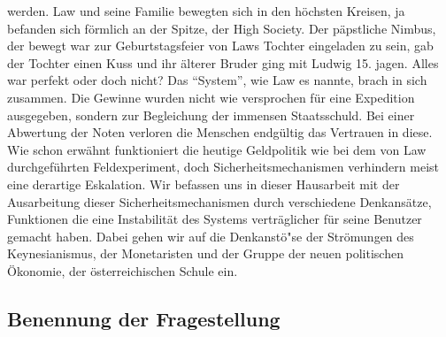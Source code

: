 \documentclass[
        onecolumn,
        a4paper,
        abstracton,
        parskip=half
        ,final
        ]{scrartcl}
\begin{document}
werden. Law und seine Familie bewegten sich in den h{\"o}chsten Kreisen, ja befanden sich f{\"o}rmlich an der Spitze, der High Society. Der p{\"a}pstliche Nimbus, der bewegt war zur Geburtstagsfeier von Laws Tochter eingeladen zu sein, gab der Tochter einen Kuss und ihr {\"a}lterer Bruder ging mit Ludwig 15. jagen.
Alles war perfekt oder doch nicht? Das "`System"', wie Law es nannte, brach in sich zusammen. Die Gewinne wurden nicht wie versprochen f{\"u}r eine Expedition ausgegeben, sondern zur Begleichung der immensen Staatsschuld. Bei einer Abwertung der Noten verloren die Menschen endg{\"u}ltig das Vertrauen in diese.
Wie schon erw{\"a}hnt funktioniert die heutige Geldpolitik wie bei dem von Law durchgef{\"u}hrten Feldexperiment, doch Sicherheitsmechanismen verhindern meist eine derartige Eskalation.
Wir befassen uns in dieser Hausarbeit mit der Ausarbeitung dieser Sicherheitsmechanismen durch verschiedene Denkans{\"a}tze, Funktionen die eine Instabilit{\"a}t des Systems vertr{\"a}glicher f{\"u}r seine Benutzer gemacht haben. Dabei gehen wir auf die Denkanst{\"o}{"s}e der Str{\"o}mungen des Keynesianismus, der Monetaristen und der Gruppe der neuen politischen {\"O}konomie, der {\"o}sterreichischen Schule ein.






\subsection{Benennung der Fragestellung}

\end{document}
